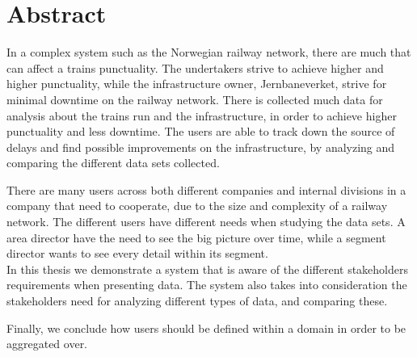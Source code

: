 \section*{Abstract}

In a complex system such as the Norwegian railway network, there are much that
can affect a trains punctuality. The undertakers strive to achieve higher and
higher punctuality, while the infrastructure owner, Jernbaneverket, strive for
minimal downtime on the railway network. There is collected much data for 
analysis about the trains run and the infrastructure, in order to achieve 
higher punctuality and less downtime. The users are able to track down the 
source of delays and find possible improvements on the infrastructure, by 
analyzing and comparing the different data sets collected.

There are many users across both different companies and internal divisions in
a company that need to cooperate, due to the size and complexity of a railway
network. The different users have different needs when studying the data sets.
A area director have the need to see the big picture over time, while a segment
director wants to see every detail within its segment. \\

In this thesis we demonstrate a system that is aware of the different
stakeholders requirements when presenting data. The system also takes into
consideration the stakeholders need for analyzing different types of data, and
comparing these. 

Finally, we conclude how users should be defined within a domain in order to 
be aggregated over.

\clearpage

